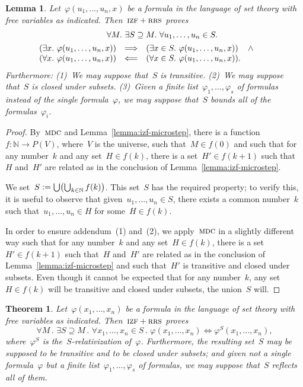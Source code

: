 \documentclass[oneside,reqno]{amsart}
\theoremstyle{definition}
\theoremstyle{plain}
\newtheorem{lemma}[defn]{Lemma}
\newtheorem{thm}[defn]{Theorem}
\theoremstyle{remark}
\newcommand{\NN}{\mathbb{N}}
\newcommand{\defeq}{\vcentcolon=}
\renewcommand{\_}{\mathpunct{.}\,}
\newcommand{\?}{\,{:}\,}
\newcommand{\IZF}{\textsc{izf}}
\newcommand{\RRS}{\textsc{rrs}}
\newcommand{\MDC}{\textsc{mdc}}
\begin{document}
\begin{lemma}\label{lemma:izf-smallstep}
Let~$\varphi(u_1,\ldots,u_n,x)$ be a formula in the language of set
theory with free variables as indicated. Then~$\IZF+\RRS$ proves
\begin{multline*}
  {\qquad}\forall M\_
  \exists S \supseteq M\_
  \forall u_1,\ldots,u_n \in S\_ \\
  \begin{array}{@{}rcl@{}}
  (\exists x\_ \varphi(u_1,\ldots,u_n,x)) &\Longrightarrow&
  (\exists x \in S\_ \varphi(u_1,\ldots,u_n,x)) \quad\mathop{\wedge} \\
  (\forall x\_ \varphi(u_1,\ldots,u_n,x)) &\Longleftarrow&
  (\forall x \in S\_ \varphi(u_1,\ldots,u_n,x)).\end{array}
  {\qquad}
\end{multline*}
Furthermore: (1)~We may suppose that~$S$ is transitive. (2)~We may suppose
that~$S$ is closed under subsets. (3)~Given a finite
list~$\varphi_1,\ldots,\varphi_s$ of formulas instead of the single
formula~$\varphi$, we may suppose that~$S$ bounds all of the
formulas~$\varphi_i$.
\end{lemma}

\begin{proof}By~$\MDC$ and Lemma~\ref{lemma:izf-microstep}, there is a
function~$f : \NN \to P(V)$, where~$V$ is the universe, such that~$M \in
f(0)$ and such that for any number~$k$ and any set~$H \in f(k)$, there is a
set~$H' \in f(k+1)$ such that~$H$ and~$H'$ are related as in the conclusion of
Lemma~\ref{lemma:izf-microstep}.

We set~$S \defeq \bigcup \bigl(\bigcup_{k \in \NN} f(k)\bigr)$. This set~$S$
has the required property; to verify this, it is useful to observe that
given~$u_1,\ldots,u_n \in S$, there exists a common number~$k$ such
that~$u_1,\ldots,u_n \in H$ for some~$H \in f(k)$.

In order to ensure addendum~(1) and~(2), we apply~$\MDC$ in a slightly
different way such that for any number~$k$ and any set~$H \in f(k)$, there is a
set~$H' \in f(k+1)$ such that~$H$ and~$H'$ are related as in the conclusion of
Lemma~\ref{lemma:izf-microstep} and such that~$H'$ is transitive and closed
under subsets. Even though it cannot be expected that for any number~$k$,
any set~$H \in f(k)$ will be transitive and closed under subsets, the union~$S$
will.
\end{proof}

\begin{thm}\label{thm:izf-bigstep}
Let~$\varphi(x_1,\ldots,x_n)$ be a formula in the language of set
theory with free variables as indicated. Then~$\IZF+\RRS$ proves
\[ \forall M\_
  \exists S \supseteq M\_
  \forall x_1,\ldots,x_n \in S\_
  \varphi(x_1,\ldots,x_n) \Leftrightarrow \varphi^S(x_1,\ldots,x_n), \]
where~$\varphi^S$ is the~$S$-relativization of~$\varphi$.
Furthermore, the resulting set~$S$ may be supposed to be transitive and to be closed
under subsets; and given not a single formula~$\varphi$ but a finite
list~$\varphi_1,\ldots,\varphi_s$ of formulas, we may suppose that~$S$ reflects
all of them.
\end{thm}
\end{document}
